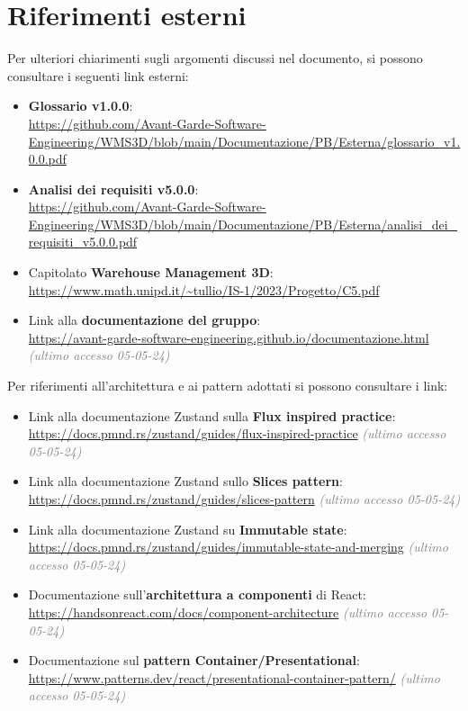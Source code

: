 \newpage
\section{Riferimenti esterni}\label{sec:ref_esterni}
Per ulteriori chiarimenti sugli argomenti discussi nel documento, si possono consultare i seguenti link esterni:
\begin{itemize}
    \item \textbf{Glossario v1.0.0}:\\
    \url{https://github.com/Avant-Garde-Software-Engineering/WMS3D/blob/main/Documentazione/PB/Esterna/glossario_v1.0.0.pdf}
    \item \textbf{Analisi dei requisiti v5.0.0}:\\
    \url{https://github.com/Avant-Garde-Software-Engineering/WMS3D/blob/main/Documentazione/PB/Esterna/analisi_dei_requisiti_v5.0.0.pdf}
    \item Capitolato \textbf{Warehouse Management 3D}:\\
    \url{https://www.math.unipd.it/~tullio/IS-1/2023/Progetto/C5.pdf} 
    \item Link alla \textbf{documentazione del gruppo}:\\
    \url{https://avant-garde-software-engineering.github.io/documentazione.html} \textcolor{gray}{\textit{(ultimo accesso 05-05-24)}}
\end{itemize}
Per riferimenti all'architettura e ai pattern adottati si possono consultare i link:
\begin{itemize}
    \item Link alla documentazione Zustand sulla \textbf{Flux inspired practice}:\\
    \url{https://docs.pmnd.rs/zustand/guides/flux-inspired-practice}
    \textcolor{gray}{\textit{(ultimo accesso 05-05-24)}}
    \item Link alla documentazione Zustand sullo \textbf{Slices pattern}:\\
    \url{https://docs.pmnd.rs/zustand/guides/slices-pattern}
    \textcolor{gray}{\textit{(ultimo accesso 05-05-24)}}
    \item Link alla documentazione Zustand su \textbf{Immutable state}:\\
    \url{https://docs.pmnd.rs/zustand/guides/immutable-state-and-merging}
    \textcolor{gray}{\textit{(ultimo accesso 05-05-24)}}
    \item Documentazione sull'\textbf{architettura a componenti} di React: \\
    \url{https://handsonreact.com/docs/component-architecture}
    \textcolor{gray}{\textit{(ultimo accesso 05-05-24)}}
    \item Documentazione sul \textbf{pattern Container/Presentational}:\\
    \url{https://www.patterns.dev/react/presentational-container-pattern/}
    \textcolor{gray}{\textit{(ultimo accesso 05-05-24)}}
\end{itemize}